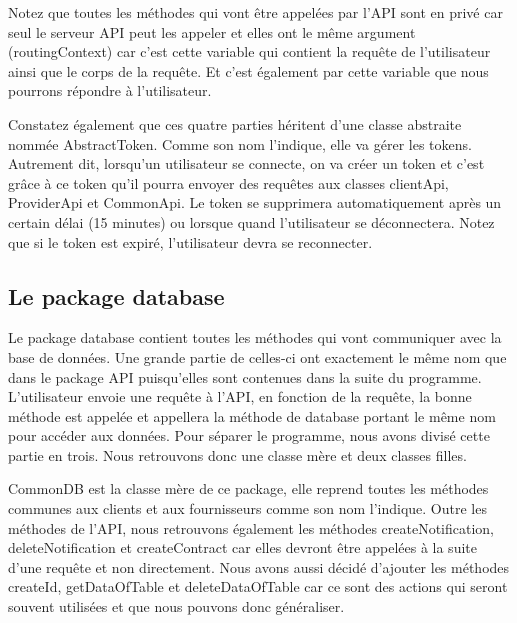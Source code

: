 \begin{flushleft}
Notez que toutes les méthodes qui vont être appelées par l'API sont en privé car seul le serveur API peut les appeler et elles ont  le même argument (routingContext) car c'est cette variable qui contient la requête de l'utilisateur ainsi que le corps de la requête. Et c'est également par cette variable que nous pourrons répondre à l'utilisateur.
\end{flushleft}

\begin{flushleft}
Constatez également que ces quatre parties héritent d'une classe abstraite nommée AbstractToken. Comme son nom l'indique, elle va gérer les tokens. Autrement dit, lorsqu'un utilisateur se connecte, on va créer un token et c'est grâce à ce token qu'il pourra envoyer des requêtes aux classes clientApi, ProviderApi et CommonApi. Le token se supprimera automatiquement après un certain délai (15 minutes) ou lorsque quand l'utilisateur se déconnectera.
\newline
Notez que si le token est expiré, l'utilisateur devra se reconnecter.
\end{flushleft}

\subsection{Le package database}

\begin{flushleft}
Le package database contient toutes les méthodes qui vont communiquer avec la base de données. Une grande partie de celles-ci ont exactement le même nom que dans le package API puisqu’elles sont contenues dans la suite du programme. L'utilisateur envoie une requête à l'API, en fonction de la requête, la bonne méthode est appelée et appellera la méthode de database portant le même nom pour accéder aux données. Pour séparer le programme, nous avons divisé  cette partie en trois. Nous retrouvons donc une classe mère et deux classes filles.
\end{flushleft}

\begin{flushleft}
CommonDB est la classe mère de ce package, elle reprend toutes les méthodes communes aux clients et aux fournisseurs comme son nom l'indique. Outre les méthodes de l'API, nous retrouvons également les méthodes createNotification, deleteNotification et createContract car elles devront être appelées à la suite d'une requête et non directement. Nous avons aussi décidé d'ajouter les méthodes createId, getDataOfTable et deleteDataOfTable car ce sont des actions qui seront souvent utilisées et que nous pouvons donc généraliser.
\end{flushleft}

